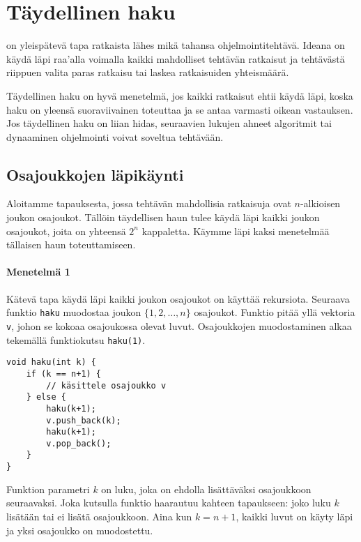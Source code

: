 \chapter{Täydellinen haku}

on yleispätevä tapa ratkaista
lähes mikä tahansa ohjelmointitehtävä.
Ideana on käydä läpi raa'alla voimalla kaikki
mahdolliset tehtävän ratkaisut ja tehtävästä riippuen
valita paras ratkaisu
tai laskea ratkaisuiden yhteismäärä.
          
Täydellinen haku on hyvä menetelmä, jos kaikki
ratkaisut ehtii käydä läpi,
koska haku on yleensä suoraviivainen toteuttaa
ja se antaa varmasti oikean vastauksen.
Jos täydellinen haku on liian hidas,
seuraavien lukujen ahneet algoritmit tai
dynaaminen ohjelmointi voivat soveltua
tehtävään.

\section{Osajoukkojen läpikäynti}


Aloitamme tapauksesta, jossa tehtävän
mahdollisia ratkaisuja ovat
$n$-alkioisen joukon osajoukot.
Tällöin täydellisen haun tulee
käydä läpi kaikki joukon osa\-joukot,
joita on yhteensä $2^n$ kappaletta.
Käymme läpi kaksi menetelmää
tällaisen haun toteuttamiseen.

\subsubsection{Menetelmä 1}

Kätevä tapa käydä läpi
kaikki joukon osajoukot on
käyttää rekursiota.
Seuraava funktio \texttt{haku} muodostaa
joukon $\{1,2,\ldots,n\}$ osajoukot.
Funktio pitää yllä vektoria \texttt{v},
johon se kokoaa osajoukossa olevat luvut.
Osajoukkojen muodostaminen alkaa
tekemällä funktiokutsu \texttt{haku(1)}.

\begin{lstlisting}
void haku(int k) {
    if (k == n+1) {
        // käsittele osajoukko v
    } else {
        haku(k+1);
        v.push_back(k);
        haku(k+1);
        v.pop_back();
    }
}
\end{lstlisting}

Funktion parametri $k$ on luku,
joka on ehdolla lisättäväksi osajoukkoon seuraavaksi.
Joka kutsulla funktio haarautuu kahteen tapaukseen:
joko luku $k$ lisätään tai ei lisätä osajoukkoon.
Aina kun $k=n+1$, kaikki luvut on käyty läpi
ja yksi osajoukko on muodostettu.

